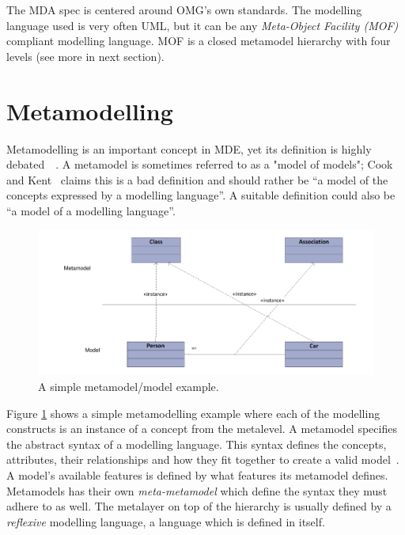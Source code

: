 The MDA spec is centered around OMG's own standards. The modelling language used is very often UML, but it can be any \emph{Meta-Object Facility (MOF)} compliant modelling language. MOF is a closed metamodel hierarchy with four levels (see more in next section).

\section{Metamodelling}
Metamodelling is an important concept in MDE, yet its definition is highly debated~\cite{rutle_thesis_2010}~\cite{rossini_thesis_2011}. A metamodel is sometimes referred to as a "model of models"; Cook and Kent~\cite{cook:domainspecificide} claims this is a bad definition and should rather be ``a model of the concepts expressed by a modelling language''. A suitable definition could also be ``a model of a modelling language''. 

\begin{figure}[h]
    \centering
    \centerline{\includegraphics[scale=0.6]{images/uml_metamodel_example.pdf}}
    \caption[UML metamodel example]{A simple metamodel/model example.}
    \label{fig:uml_metamodel_example}
\end{figure}

Figure \ref{fig:uml_metamodel_example} shows a simple metamodelling example where each of the modelling constructs is an instance of a concept from the metalevel. A metamodel specifies the abstract syntax of a modelling language. This syntax defines the concepts, attributes, their relationships and how they fit together to create a valid model~\cite{rutle_thesis_2010}. A model's available features is defined by what features its metamodel defines. Metamodels has their own \emph{meta-metamodel} which define the syntax they must adhere to as well. The metalayer on top of the hierarchy is usually defined by a \emph{reflexive} modelling language, a language which is defined in itself.

